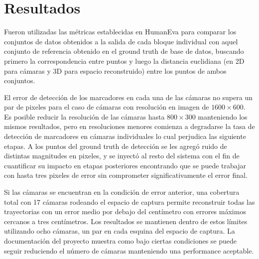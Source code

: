 \section{Resultados}

Fueron utilizadas las métricas establecidas en HumanEva \cite{humaneva} para comparar los conjuntos de datos obtenidos a la salida de cada bloque individual con aquel conjunto de referencia obtenido en el ground truth de base de datos, buscando primero la correspondencia entre puntos y luego la distancia euclidiana (en 2D para cámaras y 3D para espacio reconstruido) entre los puntos de ambos conjuntos.



El error de detección de los marcadores en cada una de las cámaras no supera un par de pixeles para el caso de cámaras con resolución en imagen de $1600\times600$. Es posible reducir la resolución de las cámaras hasta $800\times300$ manteniendo los mismos resultados, pero en resoluciones menores comienza a degradarse la tasa de detección de marcadores en cámaras individuales lo cual perjudica las siguiente etapas. A los puntos del ground truth de detección se les agregó ruido de distintas magnitudes en pixeles, y se inyectó al resto del sistema con el fin de cuantificar su impacto en etapas posteriores encontrando que se puede trabajar con hasta tres pixeles de error sin comprometer significativamente el error final.


Si las cámaras se encuentran en la condición de error anterior, una cobertura total con 17 cámaras rodeando el espacio de captura permite reconstruir todas las trayectorias con un error medio por debajo del centímetro con errores máximos cercanos a tres centímetros. Los resultados se mantienen dentro de estos límites utilizando ocho cámaras, un par en cada esquina del espacio de captura.
La documentación del proyecto \cite{proyecto_biomecanica} muestra como bajo ciertas condiciones se puede seguir reduciendo el número de cámaras manteniendo una performance aceptable.

